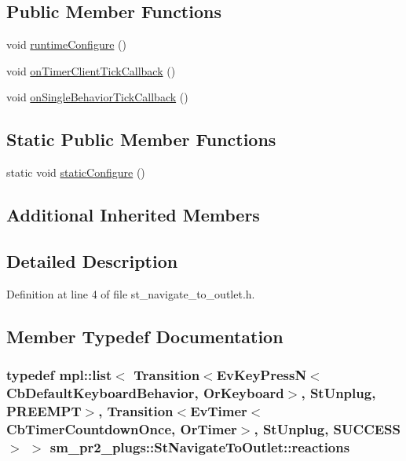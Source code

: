 \subsection*{Public Member Functions}
\begin{DoxyCompactItemize}
\item 
void \hyperlink{structsm__pr2__plugs_1_1StNavigateToOutlet_aa36e4f478b3dc1c2b8fae6ef51f4d4f8}{runtime\+Configure} ()
\item 
void \hyperlink{structsm__pr2__plugs_1_1StNavigateToOutlet_ab990f0f422deb0ef6dd4fcce9cb2823b}{on\+Timer\+Client\+Tick\+Callback} ()
\item 
void \hyperlink{structsm__pr2__plugs_1_1StNavigateToOutlet_ae6a6ee95bcc854792f0b16286a113a06}{on\+Single\+Behavior\+Tick\+Callback} ()
\end{DoxyCompactItemize}
\subsection*{Static Public Member Functions}
\begin{DoxyCompactItemize}
\item 
static void \hyperlink{structsm__pr2__plugs_1_1StNavigateToOutlet_a2dbe242376149d872ee92006b378ebf9}{static\+Configure} ()
\end{DoxyCompactItemize}
\subsection*{Additional Inherited Members}


\subsection{Detailed Description}


Definition at line 4 of file st\+\_\+navigate\+\_\+to\+\_\+outlet.\+h.



\subsection{Member Typedef Documentation}
\subsubsection[{\texorpdfstring{reactions}{reactions}}]{\setlength{\rightskip}{0pt plus 5cm}typedef mpl\+::list$<$ Transition$<$Ev\+Key\+PressN$<$Cb\+Default\+Keyboard\+Behavior, {\bf Or\+Keyboard}$>$, {\bf St\+Unplug}, {\bf P\+R\+E\+E\+M\+PT}$>$, Transition$<$Ev\+Timer$<$Cb\+Timer\+Countdown\+Once, {\bf Or\+Timer}$>$, {\bf St\+Unplug}, {\bf S\+U\+C\+C\+E\+SS}$>$ $>$ {\bf sm\+\_\+pr2\+\_\+plugs\+::\+St\+Navigate\+To\+Outlet\+::reactions}}\hypertarget{structsm__pr2__plugs_1_1StNavigateToOutlet_ab229b60e5144a98cdfd92c0928de573f}{}\label{structsm__pr2__plugs_1_1StNavigateToOutlet_ab229b60e5144a98cdfd92c0928de573f}


